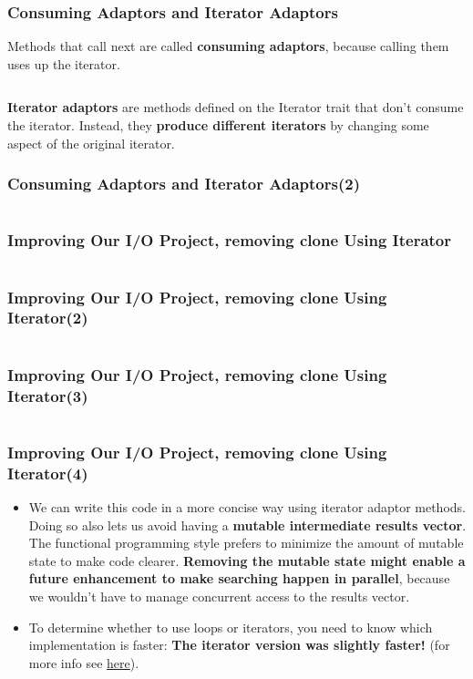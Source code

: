 \documentclass{beamer}
\begin{document}
\begin{frame}[fragile]
	\frametitle{Consuming Adaptors and Iterator Adaptors}
	Methods that call next are called \textbf{consuming adaptors}, because calling them uses up the iterator. 
	
		\inputminted[fontsize=\scriptsize]{rust}{./code/iterator4.rs}
		
		
		\textbf{Iterator adaptors }are methods defined on the Iterator trait that don’t consume the iterator. Instead, they \textbf{produce different iterators} by changing some aspect of the original iterator.
\end{frame}

\begin{frame}[fragile]
	\frametitle{Consuming Adaptors and Iterator Adaptors(2)}

	\inputminted{rust}{./code/iterator5.rs}
	
\end{frame}

\begin{frame}[fragile]
	\frametitle{Improving Our I/O Project, removing clone Using Iterator}
	
	\inputminted{rust}{./code/iterator6.rs}
	
\end{frame}

\begin{frame}[fragile]
	\frametitle{Improving Our I/O Project, removing clone Using Iterator(2)}
	
	\inputminted[fontsize=\scriptsize]{rust}{./code/iterator7.rs}
	
\end{frame}
 
 \begin{frame}[fragile]
 	\frametitle{Improving Our I/O Project, removing clone Using Iterator(3)}
 	
 	\inputminted[fontsize=\scriptsize]{rust}{./code/iterator8.rs}
 	
 \end{frame}

 \begin{frame}[fragile]
	\frametitle{Improving Our I/O Project, removing clone Using Iterator(4)}
	\begin{itemize}
		\item We can write this code in a more concise way using iterator adaptor methods. Doing so also lets us avoid having a \textbf{mutable intermediate results vector}. The functional programming style prefers to minimize the amount of mutable state to make code clearer. \textbf{Removing the mutable state might enable a future enhancement to make searching happen in parallel}, because we wouldn’t have to manage concurrent access to the results vector. 
		\item 	To determine whether to use loops or iterators, you need to know which implementation is faster: \textbf{The iterator version was slightly faster! }(for more info see \href{https://doc.rust-lang.org/book/ch13-04-performance.html}{here}).
	\end{itemize}
\end{frame} 
 
\end{document}
